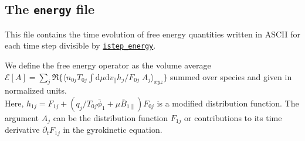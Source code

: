 \documentclass[12pt]{article}
\begin{document}
\subsection{The \texttt{energy} file}
\label{subsec:energy-file}
This file contains the time evolution of free energy
quantities written in ASCII for each time step divisible by 
\hyperlink{istep_energy}{\tt istep\_energy}. 

We define the free energy operator as the volume average\\
$\mathcal{E}[A] = \sum_j \Re\{\langle n_{0j} T_{0j}\int \mathrm{d}\mu\mathrm{d}v_{\|} h_j/F_{0j}\;
A_j\rangle_{xyz}\}$ summed over species and given in normalized units.
\\ Here, $h_{1j}=F_{1j}+(q_j/T_{0j}\bar{\phi}_1 +\mu
\bar{B}_{1\|})F_{0j}$ is a modified distribution function.
The argument $A_j$ can be the distribution function $F_{1j}$ or
contributions to its time
derivative $\partial_t F_{1j}$ in the gyrokinetic equation.
\end{document}
